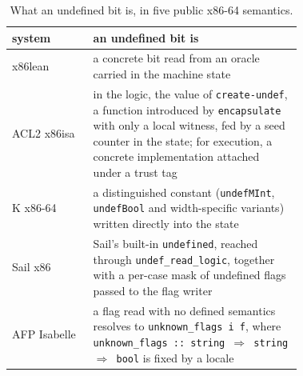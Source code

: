 \documentclass[runningheads]{llncs}
\newcommand{\src}[1]{}  %
\newcommand{\lean}[1]{\texttt{#1}}
\begin{document}
\begin{table}[t]
\caption{What an undefined bit is, in five public x86-64 semantics.}
\label{tab:undef}
\centering
\small
\begin{tabular}{@{}l>{\raggedright\arraybackslash}p{0.72\linewidth}@{}}
\toprule
system & an undefined bit is \\
\midrule
x86lean & a concrete bit read from an oracle carried in the machine state \\
ACL2 x86isa & in the logic, the value of \lean{create-undef}, a function introduced by
  \lean{encapsulate} with only a local witness, fed by a seed counter in the state; for execution, a
  concrete implementation attached under a trust tag \\
K x86-64 & a distinguished constant (\lean{undefMInt}, \lean{undefBool} and width-specific variants)
  written directly into the state \\
Sail x86 & Sail's built-in \lean{undefined}, reached through \lean{undef\_read\_logic}, together
  with a per-case mask of undefined flags passed to the flag writer \\
AFP Isabelle & a flag read with no defined semantics resolves to \lean{unknown\_flags i f}, where
  \lean{unknown\_flags :: string $\Rightarrow$ string $\Rightarrow$ bool} is fixed by a locale \\
\bottomrule
\end{tabular}
\end{table}
\src{x86isa: machine/register-readers-and-writers.lisp:1497; the trust tag in tools/execution/top.lisp.
K: semantics/x86-mint-wrapper.k:19. Sail: model/prelude.sail:74-82, model/shifts\_spec.sail,
model/rotate\_and\_shift.sail. All via docs/TACAS-G1-POSITIONING.md 1c.6 and 1c.10. AFP:
X86\_Semantics/X86\_InstructionSemantics.thy, locale unknowns and its text, read 2026-09-12 (G1 1d).}
\end{document}
